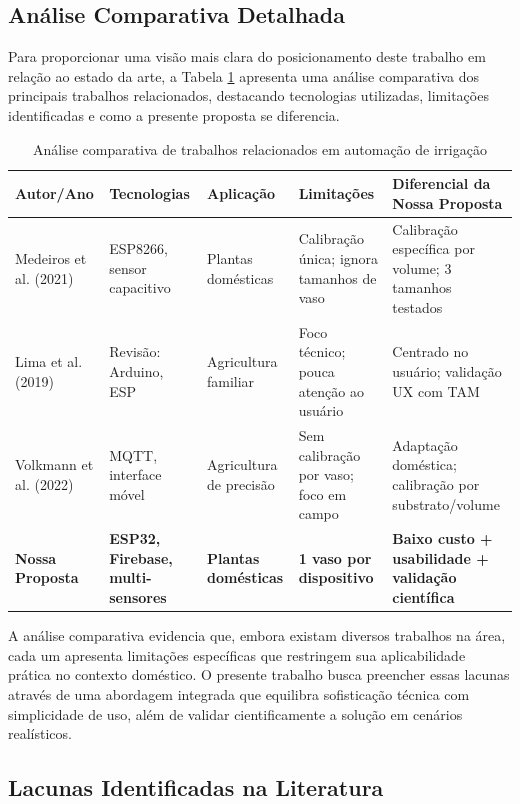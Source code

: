 \documentclass[twoside,english,brazilian]{UNISINOSmonografia}
\begin{document}
\subsection{Análise Comparativa Detalhada}

Para proporcionar uma visão mais clara do posicionamento deste trabalho em relação ao estado da arte, a Tabela \ref{tab:comparativo} apresenta uma análise comparativa dos principais trabalhos relacionados, destacando tecnologias utilizadas, limitações identificadas e como a presente proposta se diferencia.

\begin{table}[htbp]
\centering
\caption{Análise comparativa de trabalhos relacionados em automação de irrigação}
\label{tab:comparativo}
\scriptsize
\begin{tabular}{p{2.2cm}p{2.0cm}p{2.6cm}p{2.8cm}p{3.0cm}}
\toprule
\textbf{Autor/Ano} & \textbf{Tecnologias} & \textbf{Aplicação} & \textbf{Limitações} & \textbf{Diferencial da Nossa Proposta} \\
\midrule
Medeiros et al. (2021) & ESP8266, sensor capacitivo & Plantas domésticas & Calibração única; ignora tamanhos de vaso & Calibração específica por volume; 3 tamanhos testados \\
\midrule
Lima et al. (2019) & Revisão: Arduino, ESP & Agricultura familiar & Foco técnico; pouca atenção ao usuário & Centrado no usuário; validação UX com TAM \\
\midrule
Volkmann et al. (2022) & MQTT, interface móvel & Agricultura de precisão & Sem calibração por vaso; foco em campo & Adaptação doméstica; calibração por substrato/volume \\
\midrule
\textbf{Nossa Proposta} & \textbf{ESP32, Firebase, multi-sensores} & \textbf{Plantas domésticas} & \textbf{1 vaso por dispositivo} & \textbf{Baixo custo + usabilidade + validação científica} \\
\bottomrule
\end{tabular}
\end{table}

A análise comparativa evidencia que, embora existam diversos trabalhos na área, cada um apresenta limitações específicas que restringem sua aplicabilidade prática no contexto doméstico. O presente trabalho busca preencher essas lacunas através de uma abordagem integrada que equilibra sofisticação técnica com simplicidade de uso, além de validar cientificamente a solução em cenários realísticos.

\subsection{Lacunas Identificadas na Literatura}
\end{document}

